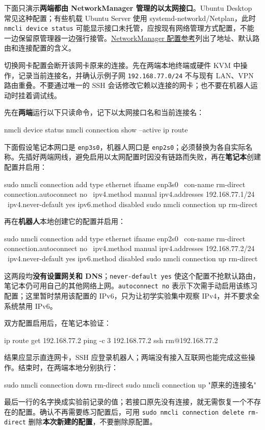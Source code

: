 下面只演示\textbf{两端都由 NetworkManager 管理的以太网接口}。Ubuntu Desktop 常见这种配置；有些机载 Ubuntu Server 使用 systemd-networkd/Netplan，此时 \texttt{nmcli device status} 可能显示接口未托管，应按现有网络管理方式配置，不能一边保留原管理器一边强行接管。\href{https://networkmanager.pages.freedesktop.org/NetworkManager/NetworkManager/nm-settings-nmcli.html}{NetworkManager 配置参考}列出了地址、默认路由和连接配置的含义。

\begin{note}
切换网卡配置会断开该网卡原来的连接。先在两端本地终端或硬件 KVM 中操作，记录当前连接名，并确认示例子网 \texttt{192.168.77.0/24} 不与现有 LAN、VPN 路由重叠。不要通过唯一的 SSH 会话修改它赖以连接的网卡；也不要在机器人运动时挂着调试线。
\end{note}

\begin{example}
先在\textbf{两端}运行以下只读命令，记下以太网接口名和当前连接名：
\begin{tbash}
nmcli device status
nmcli connection show --active
ip route
\end{tbash}
下面假设笔记本网口是 \texttt{enp3s0}，机器人网口是 \texttt{enp2s0}；必须替换为各自实际名称。先插好两端网线，避免启用以太网配置时因没有链路而失败，再在\textbf{笔记本}创建配置并启用：
\begin{tbash}
sudo nmcli connection add type ethernet ifname enp3s0 \
  con-name rm-direct connection.autoconnect no \
  ipv4.method manual ipv4.addresses 192.168.77.1/24 \
  ipv4.never-default yes ipv6.method disabled
sudo nmcli connection up rm-direct
\end{tbash}
\Needspace{9\baselineskip}
再在\textbf{机器人}本地创建它的配置并启用：
\begin{tbash}
sudo nmcli connection add type ethernet ifname enp2s0 \
  con-name rm-direct connection.autoconnect no \
  ipv4.method manual ipv4.addresses 192.168.77.2/24 \
  ipv4.never-default yes ipv6.method disabled
sudo nmcli connection up rm-direct
\end{tbash}
这两段均\textbf{没有设置网关和 DNS}；\texttt{never-default yes} 使这个配置不抢默认路由，笔记本仍可用自己的其他网络上网。\texttt{autoconnect no} 表示下次需手动启用该练习配置；这里暂时禁用该配置的 IPv6，只为让初学实验集中观察 IPv4，并不要求全系统禁用 IPv6。

双方配置启用后，在笔记本验证：
\begin{tbash}
ip route get 192.168.77.2
ping -c 3 192.168.77.2
ssh rm@192.168.77.2
\end{tbash}
结果应显示直连网卡，SSH 应登录机器人；两端没有接入互联网也能完成这些操作。结束时，在两端本地分别执行：
\begin{tbash}
sudo nmcli connection down rm-direct
sudo nmcli connection up "原来的连接名"
\end{tbash}
最后一行的名字换成实验前记录的值；若接口原先没有连接，就无需恢复一个不存在的配置。确认不再需要练习配置后，可用 \texttt{sudo nmcli connection delete rm-direct} 删除\textbf{本次新建的配置}，不要删除原配置。
\end{example}

